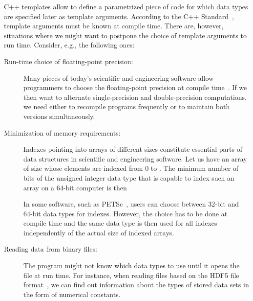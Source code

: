 \documentclass[10pt,a4paper]{article}
\theoremstyle{definition}\newtheorem{problem}{Problem}
\begin{document}
C++ templates allow to define a parametrized piece of code for which data types are specified later as template arguments. According to the C++ Standard~\cite{RefWorks:73}, template arguments must be known at compile time. There are, however, situations where we might want to postpone the choice of template arguments to run time. Consider, e.g., the following ones:
\begin{description}

\item[Run-time choice of floating-point precision:] Many pieces of today's scientific and engineering software allow programmers to choose the floating-point precision at compile time~\cite{RefWorks:74,RefWorks:78,RefWorks:58,RefWorks:35,RefWorks:5}. If we then want to alternate single-precision and double-precision computations, we need either to recompile programs frequently or to maintain both versions simultaneously.

\item[Minimization of memory requirements:] Indexes pointing into arrays of different sizes constitute essential parts of data structures in scientific and engineering software. Let us have an array of size  whose elements are indexed from 0 to . The minimum number of bits of the unsigned integer data type that is capable to index such an array on a 64-bit computer is then



In some software, such as PETSc~\cite{RefWorks:78}, users can choose between 32-bit and 64-bit data types for indexes. However, the choice has to be done at compile time and the same data type is then used for all indexes independently of the actual size of indexed arrays.

\item[Reading data from binary files:] The program might not know which data types to use until it opens the file at run time. For instance, when reading files based on the HDF5 file format~\cite{RefWorks:38}, we can find out information about the types of stored data sets in the form of numerical constants.

\end{description}
\end{document}
